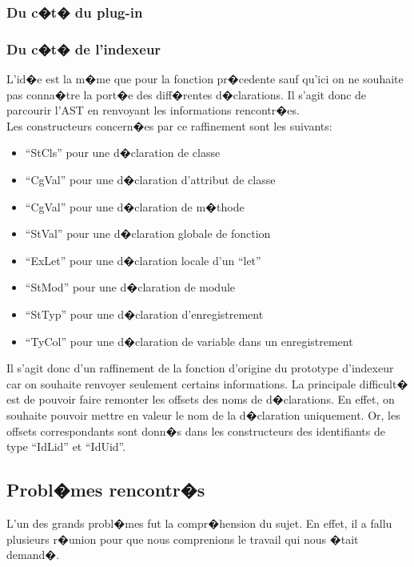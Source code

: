 \documentclass[a4paper,11pt,titlepage]{article}
\begin{document}
\newpage

\subsubsection{Du c�t� du plug-in}

\subsubsection{Du c�t� de l'indexeur}

L'id�e est la m�me que pour la fonction pr�cedente sauf qu'ici on ne souhaite pas conna�tre la port�e des diff�rentes d�clarations. Il s'agit donc de parcourir l'AST en renvoyant les informations rencontr�es.\\

Les constructeurs concern�es par ce raffinement sont les suivants:
\begin{itemize}
 \item ``StCls'' pour une d�claration de classe
 \item ``CgVal'' pour une d�claration d'attribut de classe
 \item ``CgVal'' pour une d�claration de m�thode
 \item ``StVal'' pour une d�claration globale de fonction
 \item ``ExLet'' pour une d�claration locale d'un ``let''
 \item ``StMod'' pour une d�claration de module
 \item ``StTyp'' pour une d�claration d'enregistrement
 \item ``TyCol'' pour une d�claration de variable dans un enregistrement\\
\end{itemize}

Il s'agit donc d'un raffinement de la fonction d'origine du prototype d'indexeur car on souhaite renvoyer seulement certains informations. La principale difficult� est de pouvoir faire remonter les offsets des noms de d�clarations. En effet, on souhaite pouvoir mettre en valeur le nom de la d�claration uniquement. Or, les offsets correspondants sont donn�s dans les constructeurs des identifiants de type ``IdLid'' et ``IdUid''.

\newpage
\subsection{Probl�mes rencontr�s}

L'un des grands probl�mes fut la compr�hension du sujet. En effet, il a fallu plusieurs r�union pour que nous comprenions le travail qui nous �tait demand�.\\
\end{document}
